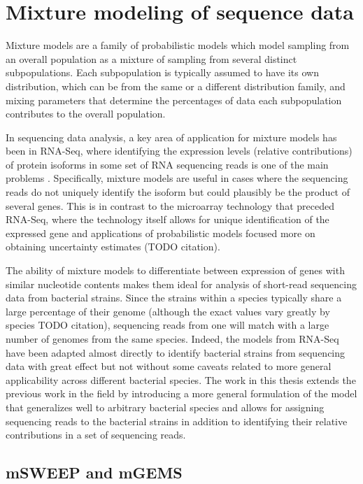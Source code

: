 \documentclass[officiallayout]{tktla}
\begin{document}
\chapter{Mixture modeling of sequence data}

Mixture models are a family of probabilistic models which model
sampling from an overall population as a mixture of sampling from
several distinct subpopulations. Each subpopulation is typically
assumed to have its own distribution, which can be from the same or a
different distribution family, and mixing parameters that determine
the percentages of data each subpopulation contributes to the overall
population.

In sequencing data analysis, a key area of application for mixture
models has been in RNA-Seq, where identifying the expression levels
(relative contributions) of protein isoforms in some set of RNA
sequencing reads is one of the main problems
\citep{garber2011computational, wang2009rna}. Specifically, mixture
models are useful in cases where the sequencing reads do not uniquely
identify the isoform but could plausibly be the product of several
genes. This is in contrast to the microarray technology that preceded
RNA-Seq, where the technology itself allows for unique identification
of the expressed gene and applications of probabilistic models focused
more on obtaining uncertainty estimates (TODO citation).

The ability of mixture models to differentiate between expression of
genes with similar nucleotide contents makes them ideal for analysis
of short-read sequencing data from bacterial strains. Since the
strains within a species typically share a large percentage of their
genome (although the exact values vary greatly by species TODO
citation), sequencing reads from one will match with a large number of
genomes from the same species. Indeed, the models from RNA-Seq have
been adapted almost directly to identify bacterial strains from
sequencing data \citep{sankar2016bayesian} with great effect but not
without some caveats related to more general applicability across
different bacterial species. The work in this thesis extends the
previous work in the field \citep{sankar2016bayesian} by introducing a
more general formulation of the model that generalizes well to
arbitrary bacterial species and allows for assigning sequencing reads
to the bacterial strains in addition to identifying their relative
contributions in a set of sequencing reads.

\section{mSWEEP and mGEMS}
\end{document}
